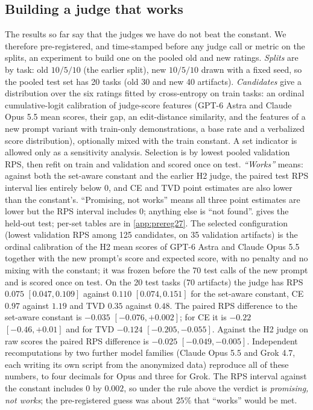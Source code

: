 \subsection{Building a judge that works}
\label{sec:exp27}
The results so far say that the judges we have do not beat the constant.
We therefore pre-registered, and time-stamped before any judge call or metric on the splits, an experiment to build one on the pooled old and new ratings.
\emph{Splits} are by task: old $10/5/10$ (the earlier split), new $10/5/10$ drawn with a fixed seed, so the pooled test set has 20 tasks (old 30 and new 40 artifacts).
\emph{Candidates} give a distribution over the six ratings fitted by cross-entropy on train tasks: an ordinal cumulative-logit calibration of judge-score features (GPT-6 Astra and Claude Opus 5.5 mean scores, their gap, an edit-distance similarity, and the features of a new prompt variant with train-only demonstrations, a base rate and a verbalized score distribution), optionally mixed with the train constant.
A set indicator is allowed only as a sensitivity analysis.
Selection is by lowest pooled validation RPS, then refit on train and validation and scored once on test.
\emph{``Works''} means: against both the set-aware constant and the earlier H2 judge, the paired test RPS interval lies entirely below $0$, and CE and TVD point estimates are also lower than the constant's.
``Promising, not works'' means all three point estimates are lower but the RPS interval includes $0$; anything else is ``not found''.
 gives the held-out test; per-set tables are in \cref{app:prereg27}.
The selected configuration (lowest validation RPS among 125 candidates, on 35 validation artifacts) is the ordinal calibration of the H2 mean scores of GPT-6 Astra and Claude Opus 5.5 together with the new prompt's score and expected score, with no penalty and no mixing with the constant; it was frozen before the 70 test calls of the new prompt and is scored once on test.
On the 20 test tasks (70 artifacts) the judge has RPS $0.075$ $[0.047,0.109]$ against $0.110$ $[0.074,0.151]$ for the set-aware constant, CE $0.97$ against $1.19$ and TVD $0.35$ against $0.48$.
The paired RPS difference to the set-aware constant is $-0.035$ $[-0.076,+0.002]$; for CE it is $-0.22$ $[-0.46,+0.01]$ and for TVD $-0.124$ $[-0.205,-0.055]$.
Against the H2 judge on raw scores the paired RPS difference is $-0.025$ $[-0.049,-0.005]$.
Independent recomputations by two further model families (Claude Opus 5.5 and Grok 4.7, each writing its own script from the anonymized data) reproduce all of these numbers, to four decimals for Opus and three for Grok. The RPS interval against the constant includes $0$ by $0.002$, so under the rule above the verdict is \emph{promising, not works}; the pre-registered guess was about $25\%$ that ``works'' would be met.
